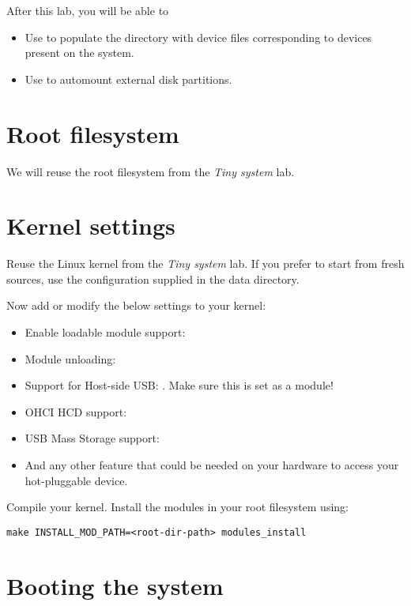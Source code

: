 
After this lab, you will be able to
\begin{itemize}
\item Use  to populate the  directory with
  device files corresponding to devices present on the system.
\item Use  to automount external disk partitions.
\end{itemize}

\section{Root filesystem}

We will reuse the root filesystem from the {\em Tiny system} lab.

\section{Kernel settings}

Reuse the Linux kernel from the {\em Tiny system} lab. If you prefer
to start from fresh sources, use the configuration supplied in the
data directory.

Now add or modify the below settings to your kernel:
\begin{itemize}
\item Enable loadable module support: 
\item Module unloading: 
\item Support for Host-side USB: . Make sure this is set as a module!
\item OHCI HCD support: 
\item USB Mass Storage support: 
\item And any other feature that could be needed on your hardware to access your hot-pluggable device.
\end{itemize}

Compile your kernel. Install the modules in your root filesystem using:
\begin{verbatim}
make INSTALL_MOD_PATH=<root-dir-path> modules_install
\end{verbatim}

\section{Booting the system}

